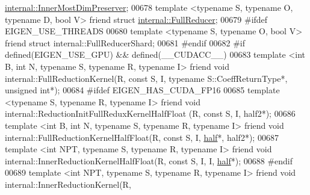 \begin{DoxyCode}
      \hyperlink{struct_eigen_1_1internal_1_1_inner_most_dim_preserver}{internal::InnerMostDimPreserver};
00678   \textcolor{keyword}{template} <\textcolor{keyword}{typename} S, \textcolor{keyword}{typename} O, \textcolor{keyword}{typename} D, \textcolor{keywordtype}{bool} V> \textcolor{keyword}{friend} \textcolor{keyword}{struct }
      \hyperlink{struct_eigen_1_1internal_1_1_full_reducer}{internal::FullReducer};
00679 \textcolor{preprocessor}{#ifdef EIGEN\_USE\_THREADS}
00680   \textcolor{keyword}{template} <\textcolor{keyword}{typename} S, \textcolor{keyword}{typename} O, \textcolor{keywordtype}{bool} V> \textcolor{keyword}{friend} \textcolor{keyword}{struct }internal::FullReducerShard;
00681 \textcolor{preprocessor}{#endif}
00682 \textcolor{preprocessor}{#if defined(EIGEN\_USE\_GPU) && defined(\_\_CUDACC\_\_)}
00683   \textcolor{keyword}{template} <\textcolor{keywordtype}{int} B, \textcolor{keywordtype}{int} N, \textcolor{keyword}{typename} S, \textcolor{keyword}{typename} R, \textcolor{keyword}{typename} I> \textcolor{keyword}{friend} \textcolor{keywordtype}{void} internal::FullReductionKernel(R, \textcolor{keyword}{
      const} S, I, \textcolor{keyword}{typename} S::CoeffReturnType*, \textcolor{keywordtype}{unsigned} \textcolor{keywordtype}{int}*);
00684 \textcolor{preprocessor}{#ifdef EIGEN\_HAS\_CUDA\_FP16}
00685   \textcolor{keyword}{template} <\textcolor{keyword}{typename} S, \textcolor{keyword}{typename} R, \textcolor{keyword}{typename} I> \textcolor{keyword}{friend} \textcolor{keywordtype}{void} internal::ReductionInitFullReduxKernelHalfFloat
      (R, \textcolor{keyword}{const} S, I, half2*);
00686   \textcolor{keyword}{template} <\textcolor{keywordtype}{int} B, \textcolor{keywordtype}{int} N, \textcolor{keyword}{typename} S, \textcolor{keyword}{typename} R, \textcolor{keyword}{typename} I> \textcolor{keyword}{friend} \textcolor{keywordtype}{void} 
      internal::FullReductionKernelHalfFloat(R, \textcolor{keyword}{const} S, I, \hyperlink{struct_eigen_1_1half}{half}*, half2*);
00687   \textcolor{keyword}{template} <\textcolor{keywordtype}{int} NPT, \textcolor{keyword}{typename} S, \textcolor{keyword}{typename} R, \textcolor{keyword}{typename} I> \textcolor{keyword}{friend} \textcolor{keywordtype}{void} 
      internal::InnerReductionKernelHalfFloat(R, \textcolor{keyword}{const} S, I, I, \hyperlink{struct_eigen_1_1half}{half}*);
00688 \textcolor{preprocessor}{#endif}
00689   \textcolor{keyword}{template} <\textcolor{keywordtype}{int} NPT, \textcolor{keyword}{typename} S, \textcolor{keyword}{typename} R, \textcolor{keyword}{typename} I> \textcolor{keyword}{friend} \textcolor{keywordtype}{void} internal::InnerReductionKernel(R, \textcolor{keyword}{
}
\end{DoxyCode}
